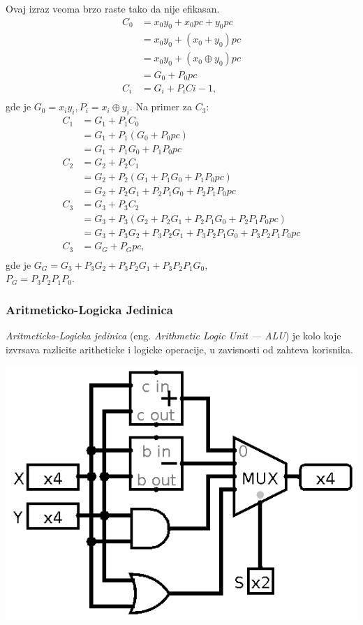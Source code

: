\documentclass[12p,a4paper]{article}
\begin{document}
\begin{multicols}{2}
    Ovaj izraz veoma brzo raste tako da nije efikasan.
    \begin{align*}
        C_0 &= x_0 y_0 + x_0 pc + y_0 pc \\
            &= x_0 y_0 + (x_0 + y_0) pc \\
            &= x_0 y_0 + (x_0\oplus y_0) pc \\
            &= G_0 + P_0 pc \\
        C_i &= G_i + P_i C{i-1}, \\
    \end{align*}
    gde je $G_0 = x_i y_i, P_i = x_i \oplus y_i$. Na primer za $C_3$:
    \begin{align*}
        C_1 &= G_1 + P_1 C_0 \\
            &= G_1 + P_1 (G_0 + P_0 pc) \\
            &= G_1 + P_1 G_0 + P_1 P_0 pc \\
        C_2 &= G_2 + P_2 C_1 \\
            &= G_2 + P_2 (G_1 + P_1 G_0 + P_1 P_0 pc) \\
            &= G_2 + P_2 G_1 + P_2 P_1 G_0 + P_2 P_1 P_0 pc \\
        C_3 &= G_3 + P_3 C_2 \\
            &= G_3 + P_3 (G_2 + P_2 G_1 + P_2 P_1 G_0 + P_2 P_1 P_0 pc) \\
            &= G_3 + P_3 G_2 + P_3 P_2 G_1 + P_3 P_2 P_1 G_0 + P_3 P_2 P_1 P_0 pc \\
        C_3 &= G_G + P_G pc, \\
    \end{align*}
    gde je $G_G = G_3 + P_3 G_2 + P_3 P_2 G_1 + P_3 P_2 P_1 G_0$, \\
    $P_G = P_3 P_2 P_1 P_0$.

    \subsubsection{Aritmeticko-Logicka Jedinica}

    \emph{Aritmeticko-Logicka jedinica} 
    (eng. \emph{Arithmetic Logic Unit --- ALU}) je kolo koje izvrsava 
    razlicite aritheticke i logicke operacije, u zavisnosti od zahteva 
    korisnika.

    \includegraphics[width=0.6\columnwidth]{Figures/alu.png}


\end{multicols}
\end{document}
